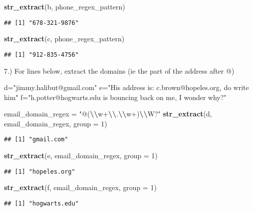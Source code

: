 \documentclass[
]{article}
\newenvironment{Shaded}{\begin{snugshade}}{\end{snugshade}}
\newcommand{\AttributeTok}[1]{\textcolor[rgb]{0.13,0.29,0.53}{#1}}
\newcommand{\DecValTok}[1]{\textcolor[rgb]{0.00,0.00,0.81}{#1}}
\newcommand{\FunctionTok}[1]{\textcolor[rgb]{0.13,0.29,0.53}{\textbf{#1}}}
\newcommand{\NormalTok}[1]{#1}
\newcommand{\OtherTok}[1]{\textcolor[rgb]{0.56,0.35,0.01}{#1}}
\newcommand{\SpecialCharTok}[1]{\textcolor[rgb]{0.81,0.36,0.00}{\textbf{#1}}}
\newcommand{\StringTok}[1]{\textcolor[rgb]{0.31,0.60,0.02}{#1}}
\begin{document}
\begin{Shaded}
\begin{Highlighting}[]
\FunctionTok{str\_extract}\NormalTok{(b, phone\_regex\_pattern)}
\end{Highlighting}
\end{Shaded}

\begin{verbatim}
## [1] "678-321-9876"
\end{verbatim}

\begin{Shaded}
\begin{Highlighting}[]
\FunctionTok{str\_extract}\NormalTok{(c, phone\_regex\_pattern)}
\end{Highlighting}
\end{Shaded}

\begin{verbatim}
## [1] "912-835-4756"
\end{verbatim}

7.) For lines below, extract the domains (ie the part of the address
after @)

\begin{Shaded}
\begin{Highlighting}[]
\NormalTok{d}\OtherTok{=}\StringTok{"jimmy.halibut@gmail.com"}
\NormalTok{e}\OtherTok{=}\StringTok{"His address is:  c.brown@hopeles.org, do write him"}
\NormalTok{f}\OtherTok{=}\StringTok{"h.potter@hogwarts.edu is bouncing back on me, I wonder why?"}

\NormalTok{email\_domain\_regex }\OtherTok{=} \StringTok{"@(}\SpecialCharTok{\textbackslash{}\textbackslash{}}\StringTok{w+}\SpecialCharTok{\textbackslash{}\textbackslash{}}\StringTok{.}\SpecialCharTok{\textbackslash{}\textbackslash{}}\StringTok{w+)}\SpecialCharTok{\textbackslash{}\textbackslash{}}\StringTok{W?"}
\FunctionTok{str\_extract}\NormalTok{(d, email\_domain\_regex, }\AttributeTok{group =} \DecValTok{1}\NormalTok{)}
\end{Highlighting}
\end{Shaded}

\begin{verbatim}
## [1] "gmail.com"
\end{verbatim}

\begin{Shaded}
\begin{Highlighting}[]
\FunctionTok{str\_extract}\NormalTok{(e, email\_domain\_regex, }\AttributeTok{group =} \DecValTok{1}\NormalTok{)}
\end{Highlighting}
\end{Shaded}

\begin{verbatim}
## [1] "hopeles.org"
\end{verbatim}

\begin{Shaded}
\begin{Highlighting}[]
\FunctionTok{str\_extract}\NormalTok{(f, email\_domain\_regex, }\AttributeTok{group =} \DecValTok{1}\NormalTok{)}
\end{Highlighting}
\end{Shaded}

\begin{verbatim}
## [1] "hogwarts.edu"
\end{verbatim}
\end{document}
